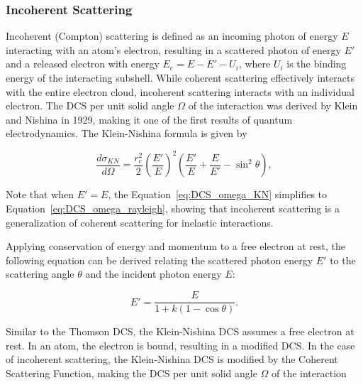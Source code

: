 \subsubsection{Incoherent Scattering}

\par Incoherent (Compton) scattering is defined as an incoming photon of energy $E$ interacting with an atom's electron, resulting in a scattered photon of energy $E'$ and a released electron with energy $E_e = E - E' - U_i$, where $U_i$ is the binding energy of the interacting subshell. While coherent scattering effectively interacts with the entire electron cloud, incoherent scattering interacts with an individual electron. The DCS per unit solid angle $\Omega$ of the interaction was derived by Klein and Nishina in 1929, making it one of the first results of quantum electrodynamics. The Klein-Nishina formula is given by

\begin{equation}
    \frac{d\sigma_{KN}}{d\Omega} = \frac{r_e^2}{2} \left(\frac{E'}{E}\right)^2 \left(\frac{E'}{E} + \frac{E}{E'} - \sin^2 \theta \right),
    \label{eq:DCS_omega_KN}
\end{equation}

\par Note that when $E' = E$, the Equation~\ref{eq:DCS_omega_KN} simplifies to Equation~\ref{eq:DCS_omega_rayleigh}, showing that incoherent scattering is a generalization of coherent scattering for inelastic interactions.

\par Applying conservation of energy and momentum to a free electron at rest, the following equation can be derived relating the scattered photon energy $E'$ to the scattering angle $\theta$ and the incident photon energy $E$:

\begin{equation}
    E' = \frac{E}{1 + k(1 - \cos \theta)}.
\end{equation}

\par Similar to the Thomson DCS, the Klein-Nishina DCS assumes a free electron at rest. In an atom, the electron is bound, resulting in a modified DCS. In the case of incoherent scattering, the Klein-Nishina DCS is modified by the Coherent Scattering Function, making the DCS per unit solid angle $\Omega$ of the interaction

